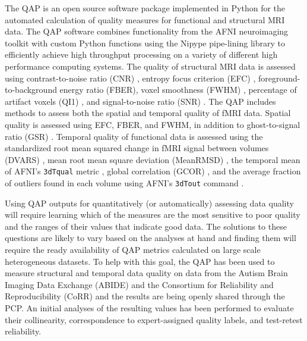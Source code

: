 The QAP is an open source software package implemented in Python for the automated calculation of quality measures for functional and structural MRI data. The QAP software combines functionality from the AFNI \citep{cox1996} neuroimaging toolkit with custom Python functions using the Nipype pipe-lining library \citep{gorgolewski_2016_50186} to efficiently achieve high throughput processing on a variety of different high performance computing systems. The quality of structural MRI data is assessed using contrast-to-noise ratio (CNR) \citep{magnotta2006}, entropy focus criterion (EFC) \citep{atkinson1997}, foreground-to-background energy ratio (FBER), voxel smoothness (FWHM) \citep{friedman2008}, percentage of artifact voxels (QI1) \citep{mortamet2009}, and signal-to-noise ratio (SNR) \citep{magnotta2006}. The QAP includes methods to assess both the spatial and temporal quality of fMRI data. Spatial quality is assessed using EFC, FBER, and FWHM, in addition to ghost-to-signal ratio (GSR) \citep{giannelli2010}. Temporal quality of functional data is assessed using the standardized root mean squared change in fMRI signal between volumes (DVARS) \citep{power2012, Nichols2013}, mean root mean square deviation (MeanRMSD) \cite{Jenkinson99FD}, the temporal mean of AFNI’s \texttt{3dTqual} metric \citep{cox1996}, global correlation (GCOR) \citep{saad2013}, and the average fraction of outliers found in each volume using AFNI’s \texttt{3dTout} command \citep{cox1996}.

Using QAP outputs for quantitatively (or automatically) assessing data quality will require learning which of the measures are the most sensitive to poor quality and the ranges of their values that indicate good data. The solutions to these questions are likely to vary based on the analyses at hand and finding them will require the ready availability of QAP metrics calculated on large scale heterogeneous datasets. To help with this goal, the QAP has been used to measure structural and temporal data quality on data from the Autism Brain Imaging Data Exchange (ABIDE) \citep{dimartino2014} and the Consortium for Reliability and Reproducibility (CoRR) \citep{zuo2014} and the results are being openly shared through the PCP. An initial analyses of the resulting values has been performed to evaluate their collinearity, correspondence to expert-assigned quality labels, and test-retest reliability.

